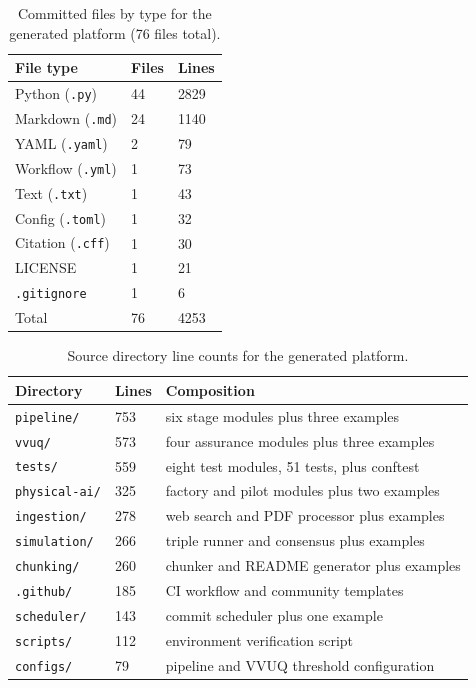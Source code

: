 \begin{table}[H]
\caption{Committed files by type for the generated platform (76 files total).}
\label{tab:methods_filetypes}
\centering
\begin{tabularx}{\textwidth}{>{\raggedright\arraybackslash}X C{3.0cm} C{3.0cm}}
\toprule
\textbf{File type} & \textbf{Files} & \textbf{Lines} \\
\midrule
  Python (\texttt{.py})            & 44 & 2829 \\
  Markdown (\texttt{.md})          & 24 & 1140 \\
  YAML (\texttt{.yaml})            & 2  & 79 \\
  Workflow (\texttt{.yml})         & 1  & 73 \\
  Text (\texttt{.txt})             & 1  & 43 \\
  Config (\texttt{.toml})          & 1  & 32 \\
  Citation (\texttt{.cff})         & 1  & 30 \\
  LICENSE                          & 1  & 21 \\
  \texttt{.gitignore}              & 1  & 6 \\
  \midrule
  Total                            & 76 & 4253 \\
\bottomrule
\end{tabularx}
\end{table}

\begin{table}[H]
\caption{Source directory line counts for the generated platform.}
\label{tab:methods_dirlines}
\centering
\begin{tabularx}{\textwidth}{L{3.2cm} C{2.4cm} >{\raggedright\arraybackslash}X}
\toprule
\textbf{Directory} & \textbf{Lines} & \textbf{Composition} \\
\midrule
  \texttt{pipeline/}    & 753 & six stage modules plus three examples \\
  \texttt{vvuq/}        & 573 & four assurance modules plus three examples \\
  \texttt{tests/}       & 559 & eight test modules, 51 tests, plus conftest \\
  \texttt{physical-ai/} & 325 & factory and pilot modules plus two examples \\
  \texttt{ingestion/}   & 278 & web search and PDF processor plus examples \\
  \texttt{simulation/}  & 266 & triple runner and consensus plus examples \\
  \texttt{chunking/}    & 260 & chunker and README generator plus examples \\
  \texttt{.github/}     & 185 & CI workflow and community templates \\
  \texttt{scheduler/}   & 143 & commit scheduler plus one example \\
  \texttt{scripts/}     & 112 & environment verification script \\
  \texttt{configs/}     & 79  & pipeline and VVUQ threshold configuration \\
\bottomrule
\end{tabularx}
\end{table}

